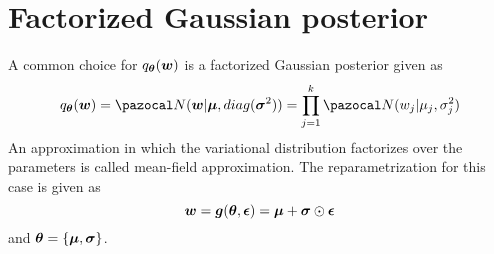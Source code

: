 \section{Factorized Gaussian posterior}
A common choice for $q_{\boldsymbol{\theta}}(\boldsymbol{w})$ is a factorized Gaussian posterior given as
\begin{equation}
	q_{\bth}(\bw) = \cN(\bw|\boldsymbol{\mu}, diag(\boldsymbol{\sigma}^2)) = \prod_{j = 1}^{k} \cN(w_j|\mu_j, \sigma_j^2)
\end{equation} 
An approximation in which the variational distribution factorizes over the parameters is called mean-field approximation.
The reparametrization for this case is given as
\begin{equation}
\boldsymbol{w} = \boldsymbol{g}(\boldsymbol{\theta}, \boldsymbol{\epsilon}) = \boldsymbol{\mu} + \boldsymbol{\sigma} \odot \boldsymbol{\epsilon}
\end{equation} 
and $\boldsymbol{\theta} = \{\boldsymbol{\mu}, \boldsymbol{\sigma}\}$.



\newpage	
\printbibliography[heading=bibintoc,title={References}]
	
